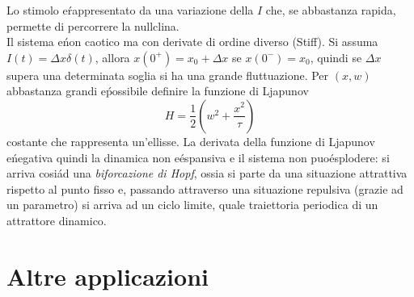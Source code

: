 \documentclass[12pt, a4paper]{book}
\theoremstyle{theorem}
\begin{document}
				Lo stimolo e\' rappresentato da una variazione della $I$ che, se abbastanza rapida, permette di percorrere la nullclina.\\
				Il sistema e\' non caotico ma con derivate di ordine diverso (Stiff).
				Si assuma $I(t)=\Delta x\delta(t)$, allora $x(0^+)=x_0+\Delta x$ se $x(0^-)=x_0$, quindi se $\Delta x$ supera una determinata soglia si ha una grande fluttuazione.
				Per $(x,w)$ abbastanza grandi e\' possibile definire la funzione di Ljapunov
				\begin{equation}
					H=\frac{1}{2}\left(w^2+\frac{x^2}{\tau}\right)
				\end{equation}
				costante che rappresenta un'ellisse.
				La derivata della funzione di Ljapunov e\' negativa quindi la dinamica non e\' espansiva e il sistema non puo\' esplodere: si arriva cosi\' ad una \emph{biforcazione di Hopf}, ossia si parte da una situazione attrattiva rispetto al punto fisso e, passando attraverso una situazione repulsiva (grazie ad un parametro) si arriva ad un ciclo limite, quale traiettoria periodica di un attrattore dinamico.

	\chapter{Altre applicazioni} %
\end{document}
